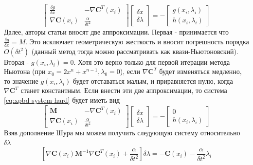 \begin{equation} \label{eq:xpbd-system-hard}
	\left[
		\begin{array}{cc}
			\frac{\delta g}{\delta x} & -\nabla \textbf{C}^T(x_i)\\
			\nabla \textbf{C}(x_i) & \frac{\alpha}{\delta t^2}
		\end{array}
	\right]\left[
		\begin{array} {c}
			\delta x\\
			\delta \lambda
		\end{array}
	\right]	= -\left[
		\begin{array}{c}
			g(x_i, \lambda_i)\\
			h(x_i, \lambda_i)
		\end{array}
	\right]
\end{equation}
	Далее, авторы статьи вносят две аппроксимации. Первая - принимается что $\frac{\delta g}{\delta x} = M$. Это исключает геометрическую жесткость и вносит погрешность порядка $O(\delta t^2)$ (данный метод тогда можно рассматривать как квази-Ньютоновский). Вторая - $g(x_i, \lambda_i) = 0$. Хотя это верно только для первой итерации метода Ньютона (при $x_0 = 2x^n + x^{n-1}, \lambda_0 = 0$), если $\nabla \textbf{C}^T$ будет изменяться медленно, то значение $g(x_i, \lambda_i)$ будет отставаться малым, и приравняется нулю, когда $\nabla \textbf{C}^T$ станет константным. Если внести эти две аппроксимации, то система \ref{eq:xpbd-system-hard} будет иметь вид 
\begin{equation} \label{eq:xpbd-system-hard}
	\left[
	\begin{array}{cc}
		\textbf{M} & -\nabla \textbf{C}^T(x_i)\\
		\nabla \textbf{C}(x_i) & \frac{\alpha}{\delta t^2}
	\end{array}
	\right]\left[
	\begin{array} {c}
		\delta x\\
		\delta \lambda
	\end{array}
	\right]	= -\left[
	\begin{array}{c}
		0\\
		h(x_i, \lambda_i)
	\end{array}
	\right]
\end{equation}
	Взяв дополнение Шура мы можем получить следующую систему относительно $\delta \lambda$
\begin{equation} \label{eq:xpbd-delta-lambda}
	\left[\nabla \textbf{C}(x_i) \textbf{M}^{-1} \nabla \textbf{C}^T(x_i) + \frac{\alpha}{\delta t^2}\right]\delta \lambda = -\textbf{C}(x_i) - \frac{\alpha}{\delta t^2}\lambda_i
\end{equation}	
